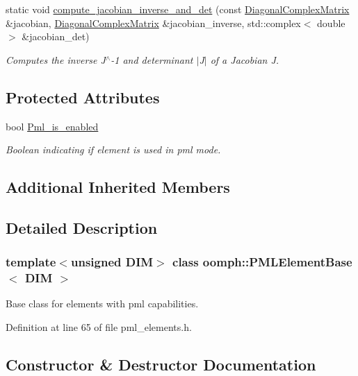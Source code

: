\begin{DoxyCompactItemize}
static void \hyperlink{classoomph_1_1PMLElementBase_adb8311fd47392b0ccc1ed2e1c748ce41}{compute\+\_\+jacobian\+\_\+inverse\+\_\+and\+\_\+det} (const \hyperlink{classoomph_1_1DiagonalComplexMatrix}{Diagonal\+Complex\+Matrix} \&jacobian, \hyperlink{classoomph_1_1DiagonalComplexMatrix}{Diagonal\+Complex\+Matrix} \&jacobian\+\_\+inverse, std\+::complex$<$ double $>$ \&jacobian\+\_\+det)
\begin{DoxyCompactList}\small\item\em Computes the inverse J$^\wedge$-\/1 and determinant $\vert$\+J$\vert$ of a Jacobian J. \end{DoxyCompactList}\end{DoxyCompactItemize}
\subsection*{Protected Attributes}
\begin{DoxyCompactItemize}
\item 
bool \hyperlink{classoomph_1_1PMLElementBase_a0b0e980998764978801a1f0463a31989}{Pml\+\_\+is\+\_\+enabled}
\begin{DoxyCompactList}\small\item\em Boolean indicating if element is used in pml mode. \end{DoxyCompactList}\end{DoxyCompactItemize}
\subsection*{Additional Inherited Members}


\subsection{Detailed Description}
\subsubsection*{template$<$unsigned D\+IM$>$\newline
class oomph\+::\+P\+M\+L\+Element\+Base$<$ D\+I\+M $>$}

Base class for elements with pml capabilities. 

Definition at line 65 of file pml\+\_\+elements.\+h.



\subsection{Constructor \& Destructor Documentation}
\mbox{\label{classoomph_1_1PMLElementBase_ad29eae1793cca20aafa774086da1fc47}} 
